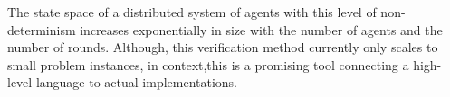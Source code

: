   The state space of a distributed system of agents with this level of non-determinism increases exponentially in size with the number of agents and the number of rounds. Although, this verification method currently only scales to small problem instances, in context,this is a promising tool connecting a high-level language to actual implementations.





 



